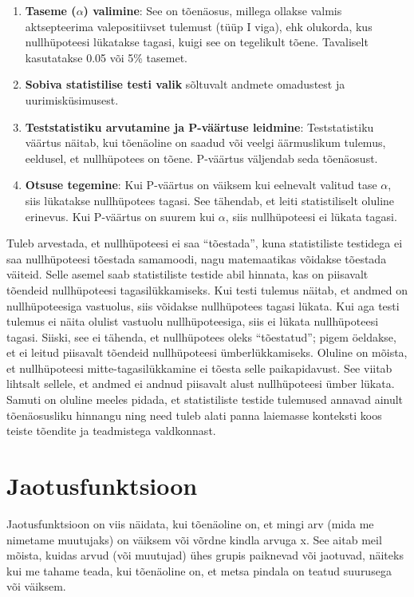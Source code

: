 \documentclass[
]{book}
\begin{document}
\begin{enumerate}
\def\labelenumi{\arabic{enumi}.}
\setcounter{enumi}{1}
\item
  \textbf{Taseme (\(\alpha\)) valimine}: See on tõenäosus, millega ollakse valmis aktsepteerima valepositiivset tulemust (tüüp I viga), ehk olukorda, kus nullhüpoteesi lükatakse tagasi, kuigi see on tegelikult tõene. Tavaliselt kasutatakse 0.05 või 5\% tasemet.
\item
  \textbf{Sobiva statistilise testi valik} sõltuvalt andmete omadustest ja uurimisküsimusest.
\item
  \textbf{Teststatistiku arvutamine ja P-väärtuse leidmine}: Teststatistiku väärtus näitab, kui tõenäoline on saadud või veelgi äärmuslikum tulemus, eeldusel, et nullhüpotees on tõene. P-väärtus väljendab seda tõenäosust.
\item
  \textbf{Otsuse tegemine}: Kui P-väärtus on väiksem kui eelnevalt valitud tase \(\alpha\), siis lükatakse nullhüpotees tagasi. See tähendab, et leiti statistiliselt oluline erinevus. Kui P-väärtus on suurem kui \(\alpha\), siis nullhüpoteesi ei lükata tagasi.
\end{enumerate}

Tuleb arvestada, et nullhüpoteesi ei saa ``tõestada'', kuna statistiliste testidega ei saa nullhüpoteesi tõestada samamoodi, nagu matemaatikas võidakse tõestada väiteid. Selle asemel saab statistiliste testide abil hinnata, kas on piisavalt tõendeid nullhüpoteesi tagasilükkamiseks. Kui testi tulemus näitab, et andmed on nullhüpoteesiga vastuolus, siis võidakse nullhüpotees tagasi lükata. Kui aga testi tulemus ei näita olulist vastuolu nullhüpoteesiga, siis ei lükata nullhüpoteesi tagasi. Siiski, see ei tähenda, et nullhüpotees oleks ``tõestatud''; pigem öeldakse, et ei leitud piisavalt tõendeid nullhüpoteesi ümberlükkamiseks. Oluline on mõista, et nullhüpoteesi mitte-tagasilükkamine ei tõesta selle paikapidavust. See viitab lihtsalt sellele, et andmed ei andnud piisavalt alust nullhüpoteesi ümber lükata. Samuti on oluline meeles pidada, et statistiliste testide tulemused annavad ainult tõenäosusliku hinnangu ning need tuleb alati panna laiemasse konteksti koos teiste tõendite ja teadmistega valdkonnast.

\section{Jaotusfunktsioon}\label{jaotusfunktsioon}

Jaotusfunktsioon on viis näidata, kui tõenäoline on, et mingi arv (mida me nimetame muutujaks) on väiksem või võrdne kindla arvuga x. See aitab meil mõista, kuidas arvud (või muutujad) ühes grupis paiknevad või jaotuvad, näiteks kui me tahame teada, kui tõenäoline on, et metsa pindala on teatud suurusega või väiksem.
\end{document}
